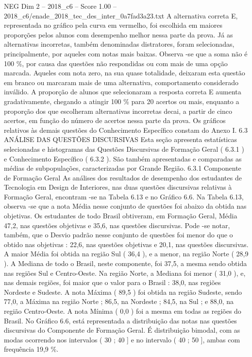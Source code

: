 \begin{textsample}{NEG Dim 2 – 2018\_c6 – Score 1.00 – 2018\_c6/enade\_2018\_tec\_des\_inter\_0a7fad3a23.txt}
A alternativa correta E, representada no gráfico pela curva em vermelho, foi escolhida em maiores proporções pelos alunos com desempenho melhor nessa parte da prova.
Já as alternativas incorretas, também denominadas distratores, foram selecionadas, principalmente, por aqueles com notas mais baixas.
Observa -se que a soma não é 100 \%, por causa das questões não respondidas ou com mais de uma opção marcada.
Aqueles com nota zero, na sua quase totalidade, deixaram esta questão em branco ou marcaram mais de uma alternativa, comportamento considerado inválido.
A proporção de alunos que selecionaram a resposta correta E aumenta gradativamente, chegando a atingir 100 \% para 20 acertos ou mais, enquanto a proporção dos que escolheram alternativas incorretas decai, a partir de cinco acertos, em função do número de acertos nessa parte da prova.
Os gráficos relativos às demais questões do Conhecimento Específico constam do Anexo I. 6.3 ANÁLISE DAS QUESTÕES DISCURSIVAS Esta seção apresenta estatísticas selecionadas e histogramas das Questões Discursivas de Formação Geral ( 6.3.1 ) e Conhecimento Específico ( 6.3.2 ).
São também apresentadas e comparadas as médias de subpopulações, caracterizadas por Grande Região. 6.3.1 Componente de Formação Geral As análises dos resultados de desempenho dos estudantes de Tecnologia em Design de Interiores, nas duas questões discursivas relativas à Formação Geral, encontram -se na Tabela 6.13 e no Gráfico 6.6.
Na Tabela 6.13, observa -se que a nota Média nesse conjunto de questões foi abaixo da obtida nas objetivas.
Os estudantes de todo Brasil obtiveram, em Formação Geral, Média 47,2, nas questões objetivas e 35,6, nas questões discursivas.
Pode -se notar, também, que o Desvio padrão nesse conjunto de questões foi menor do que o obtido nas objetivas : 22,6, nas questões objetivas e 20,1, nas questões discursivas.
A maior Média foi obtida na região Sul ( 36,4 ), e a menor, na região Norte ( 28,9 ).
A Mediana de todo o Brasil, neste componente, foi 37,5, a mesma sendo obtida nas regiões Sul e Centro-Oeste.
Na região Norte, a Mediana foi menor ( 31,0 ), e, nas demais regiões, foi maior que o valor para o Brasil : 38,0, nas regiões Nordeste e Sudeste.
A nota Máxima ( 89,5 ) foi obtida na região Sudeste, sendo 77,0, a Máxima na região Norte ; 86,5, na Nordeste ; 84,5, na Sul ; e 88,0, na região Centro-Oeste.
A nota Mínima ( 0,0 ) foi a mesma em todas as regiões do Brasil.
No Gráfico 6.6, está representada a distribuição das notas nas questões discursivas do Componente de Formação Geral.
É distribuição bimodal, com as modas ocorrendo nos intervalos ( 30 ; 40 ] e no intervalo ( 40 ; 50 ], ambas com frequência 19,9 \%.

\end{textsample}

